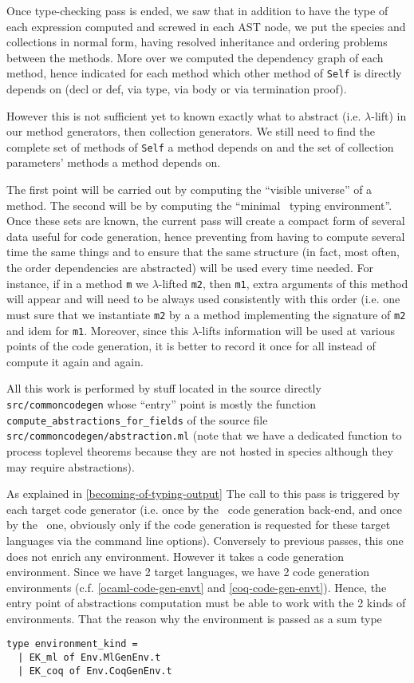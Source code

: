 \label{intermediate-abstractions}
Once type-checking pass is ended, we saw that in addition to have the
type of each expression computed and screwed in each AST node, we put
the species and collections in normal form, having resolved
inheritance and ordering problems between the methods. More over we
computed the dependency graph of each method, hence indicated for each
method which other method of {\tt Self} is directly depends on (decl
or def, via type, via body or via termination proof).

However this is not sufficient yet to known exactly what to abstract
(i.e. $\lambda$-lift) in our method generators, then collection
generators. We still need to find the complete set of methods of
{\tt Self} a method depends on and the set of collection parameters'
methods a method depends on.

The first point will be carried out by computing the ``visible
universe'' of a method. The second will be by computing the ``minimal
\coq\ typing environment''. Once these sets are known, the current
pass will create a compact form of several data useful for code
generation, hence preventing from having to compute several time the
same things and to ensure that the same structure (in fact, most
often, the order dependencies are abstracted) will be used every time
needed. For instance, if in a method {\tt m} we $\lambda$-lifted
{\tt m2}, then {\tt m1}, extra arguments of this method will appear
and will need to be always used consistently with this order (i.e. one
must sure that we instantiate {\tt m2} by a a method implementing the
signature of {\tt m2} and idem for {\tt m1}. Moreover, since this
$\lambda$-lifts information will be used at various points of the code
generation, it is better to record it once for all instead of compute
it again and again.

All this work is performed by stuff located in the source directly
{\tt src/commoncodegen} whose ``entry'' point is mostly the function
{\tt compute\_abstractions\_for\_fields} of the source file
{\tt src/commoncodegen/abstraction.ml} (note that we have a dedicated
function to process toplevel theorems because they are not hosted in
species although they may require abstractions).

As explained in \ref{becoming-of-typing-output} The call to this pass
is triggered by each target code generator (i.e. once by the
\ocaml\ code generation back-end, and once by the \coq\ one, obviously
only if the code generation is requested for these target languages
via the command line options). Conversely to previous passes, this one
does not enrich any environment. However it takes a code generation
environment. Since we have 2 target languages, we have 2 code
generation environments (c.f. \ref{ocaml-code-gen-envt} and
\ref{coq-code-gen-envt}). Hence, the entry point of abstractions
computation must be able to work with the 2 kinds of
environments. That the reason why the environment is passed as a sum
type
{\footnotesize
\begin{lstlisting}[language=MyOCaml]
type environment_kind =
  | EK_ml of Env.MlGenEnv.t
  | EK_coq of Env.CoqGenEnv.t
\end{lstlisting}
}

